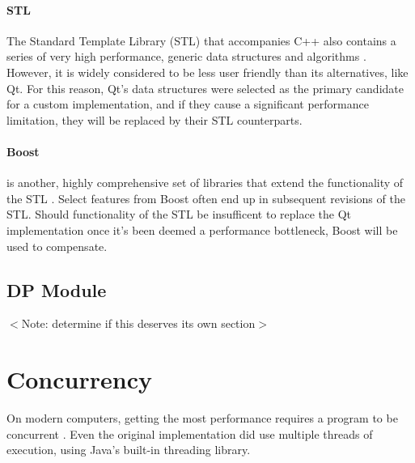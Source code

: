 \documentclass[a4paper,12pt]{report}
\begin{document}
\paragraph{STL}
The Standard Template Library (STL) that accompanies C++ also contains a series of very high performance, generic data structures and algorithms \autocite{stl}. However, it is widely considered to be less user friendly than its alternatives, like Qt. For this reason, Qt's data structures were selected as the primary candidate for a custom implementation, and if they cause a significant performance limitation, they will be replaced by their STL counterparts.

\paragraph{Boost}
is another, highly comprehensive set of libraries that extend the functionality of the STL \autocite{boost}. Select features from Boost often end up in subsequent revisions of the STL. Should functionality of the STL be insufficent to replace the Qt implementation once it's been deemed a performance bottleneck, Boost will be used to compensate.

\subsection{DP Module}
$<$Note: determine if this deserves its own section$>$

\section{Concurrency}
On modern computers, getting the most performance requires a program to be concurrent \autocite{freelunch}. Even the original implementation did use multiple threads of execution, using Java's built-in threading library.

\printbibliography
\end{document}
